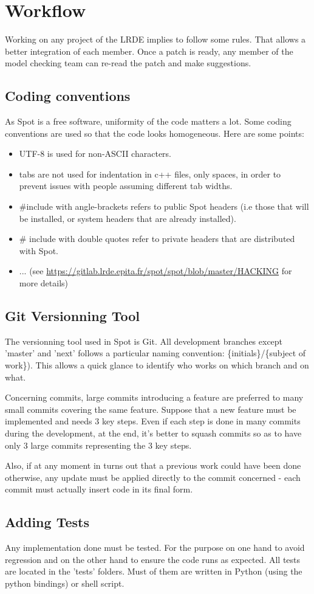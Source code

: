 \section{Workflow}
Working on any project of the LRDE implies to follow some rules. That allows a better integration of each
member. Once a patch is ready, any member of the model checking team can re-read the patch and make
suggestions.

\subsection{Coding conventions}
As Spot is a free software, uniformity of the code matters a lot. Some coding conventions are used so that
the code looks homogeneous. Here are some points:
\begin{itemize}
 \item UTF-8 is used for non-ASCII characters.
 \item tabs are not used for indentation in c++ files, only spaces, in order to prevent issues with people
 assuming different tab widths.
 \item \#include with angle-brackets refers to public Spot headers (i.e those that will be installed, or
 system headers that are already installed).
 \item \# include with double quotes refer to private headers that are distributed with Spot.
 \item ... (see \url{https://gitlab.lrde.epita.fr/spot/spot/blob/master/HACKING} for more details)
\end{itemize}

\subsection{Git Versionning Tool}
The versionning tool used in Spot is Git. All development branches except 'master' and 'next' follows a
particular naming convention: \{initials\}/\{subject of work\}). This allows a quick glance to identify
who works on which branch and on what.

Concerning commits, large commits introducing a feature are preferred to many small commits covering
the same feature. Suppose that a new feature must be implemented and needs 3 key steps. Even if each step
is done in many commits during the development, at the end, it's better to squash commits so as to have
only 3 large commits representing the 3 key steps.

Also, if at any moment in turns out that a previous work
could have been done otherwise, any update must be applied directly to the commit concerned - each commit
must actually insert code in its final form.

\subsection{Adding Tests}
Any implementation done must be tested. For the purpose on one hand to avoid regression and on the other
hand to ensure the code runs as expected. All tests are located in the 'tests' folders. Must of them
are written in Python (using the python bindings) or shell script.

